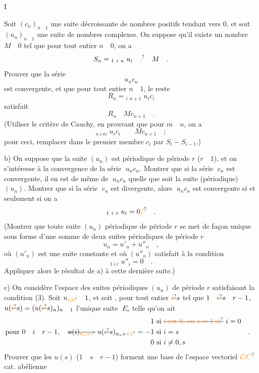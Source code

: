 I

Soit $(c_n)_{n\quad1}$ une suite décroissante de nombres positifs tendant vers  0, et soit $(u_n)_{n\quad1}$ une suite de nombres complexes.  On suppose qu'il existe un nombre $M\quad0$ tel que pour tout entier $n\quad0$, on a
\[
S_n={}_{1\ i\ n}\;u_i\quad \unsure{.}\quad M\quad .
\]
 Prouver que la série
\[
u_n c_n
\]
est convergente, et que pour tout entier $n\quad1$, le reste
\[
R_n={}_{i\ \,n+1}\;u_i c_i
\]
satisfait
\[
R_n\quad Mc_{n+1}\quad .
\]
(Utiliser le critère de Cauchy, en prouvant que pour $m\quad n$, on a
\[
{}_{n\ i\ m}\;u_i c_i\qquad Mc_{n+1}\quad ;
\]
pour ceci, remplacer dans le premier membre $c_i$ par $S_i-S_{i-1}$.)

b) On suppose que la suite $(u_n)$ est périodique de période $r$ ($r\quad1$), et on s'intéresse à la convergence de la série $\;u_n c_n$. Montrer que si la série $\;c_n$ est convergente, il en est de même de $\;u_n c_n$ quelle que soit la suite (périodique) $(u_n)$. Montrer que si la série $\;c_n$ est divergente, alors $\;u_n c_n$ est convergente si et seulement si on a
\[
{}_{1\ i\ r}\;u_i=0\unsure{/}\quad .
\]
(Montrer que toute suite $(u_n)$ périodique de période $r$ se met de façon unique sous forme d'une somme de deux suites périodiques de période $r$
\[
u_n=u'_n+u''_n\quad ,
\]
où $(u'_n)$ est une suite constante et où $(u''_n)$ satisfait à la condition
\[
{}_{1\ i\ r}\;u''_i=0\quad .
\]
Appliquer alors le résultat de a) à cette dernière suite.)

c) On considère l'espace  des suites périodiques $(u_n)$ de période $r$ satisfaisant la condition (3). Soit $n_{\unsure{o|0}}\quad1$, et soit , pour tout entier $\deleted{\unsure{i}}s$ tel que $1\quad\deleted{\unsure{i}}s\quad r-1$, $u(\deleted{\unsure{i}}s)=(u(\deleted{\unsure{i}}s)_n)_{n\quad1}$ l'unique suite $\;E_r$ telle qu'on ait
\[
\begin{aligned}
\text{pour }0\quad i\quad r-1,\quad \deleted{u(i)_{\unsure{n_o+i}}}\;u(\deleted{\unsure{i}}s)_{n_o+\unsure{i|1}}&=\begin{aligned}
1&\ \text{si }\deleted{\text{\unsure{$i$ est 0, ou $s=1$ si}}}\ i=0\\
-1&\ \text{si }i=s\\
0&\ \text{si }i\ne0,s
\end{aligned}\quad .
\end{aligned}
\]
Prouver que les $u(s)$ ($1\quad s\quad r-1$) forment une base de l'espace vectoriel
$\unsure{\mathcal C|C}$ cat. abélienne

